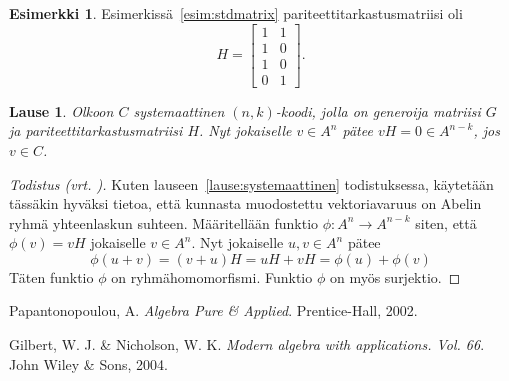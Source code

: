 \documentclass[a4paper,12pt,leqno,oneside]{report} %
\theoremstyle{plain}
\newtheorem{lause}{Lause}[chapter]
\theoremstyle{definition}
\newtheorem{esimerkki}{Esimerkki}[chapter]
\theoremstyle{remark}
\numberwithin{equation}{chapter}
\begin{document}
    \begin{esimerkki}\label{esim:parcheckmatrix}
        Esimerkissä~\ref{esim:stdmatrix} pariteettitarkastusmatriisi oli
        \[
            H = 
            \begin{bmatrix}
                1 & 1 \\
                1 & 0 \\
                1 & 0 \\
                0 & 1
            \end{bmatrix}.
        \]
    \end{esimerkki}

    \begin{lause}\label{lause:sanojensyndroomat}
        Olkoon $C$ systemaattinen $(n, k)$-koodi, jolla on generoija matriisi $G$ ja pariteettitarkastusmatriisi $H$. Nyt jokaiselle $v \in A^n$ pätee $vH = 0 \in A^{n-k}$, jos $v \in C$.
    \end{lause}

    \begin{proof}[Todistus \upshape(vrt. {\cite[s.~499]{PA}})]\label{tod:sanojensyndroomat}
        Kuten lauseen~\ref{lause:systemaattinen} todistuksessa, käytetään tässäkin hyväksi tietoa, että kunnasta muodostettu vektoriavaruus on Abelin ryhmä yhteenlaskun suhteen. Määritellään funktio $\phi:A^n \rightarrow A^{n-k}$ siten, että $\phi(v) = vH$ jokaiselle $v \in A^n$. Nyt jokaiselle $u, v \in A^n$ pätee
        \[
            \phi(u + v) = (v + u)H = uH + vH = \phi(u) + \phi(v)
        \]
        Täten funktio $\phi$ on ryhmähomomorfismi. Funktio $\phi$ on myös surjektio.
    \end{proof}

    \begin{thebibliography}{9}


        Papantonopoulou, A.
        \emph{Algebra Pure \& Applied}.
        Prentice-Hall, 2002.

        Gilbert, W. J. \& Nicholson, W. K.
        \emph{Modern algebra with applications. Vol. 66}.
        John Wiley \& Sons, 2004.

\end{thebibliography}
\end{document}

